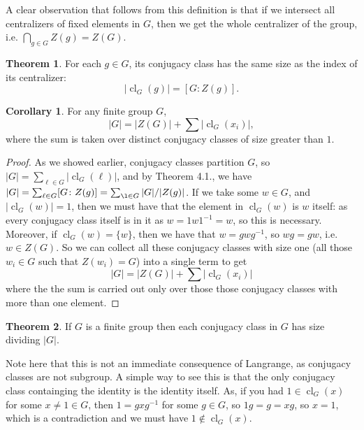 \documentclass[9pt,reqno]{amsart}
\theoremstyle{definition}
\newtheorem{theorem}{Theorem}[section]
\newtheorem{rem}{Remark}[section]
\newtheorem{coro}{Corollary}[section]
\DeclareMathOperator{\cl}{cl}
\begin{document}
A clear observation that follows from this definition is that if we intersect all centralizers of fixed elements in $G$, then we get the whole centralizer of the group, i.e. $\bigcap_{g \in G} Z(g) = Z(G)$. 
\begin{theorem}
	For each $g \in G$, its conjugacy class has the same size as the index of its centralizer:
	$$| \cl_G (g) | = [G \colon Z(g) ].$$
\end{theorem}
\begin{coro}
For any finite group $G$,  $$ |G| = |Z(G)| + \sum |\cl_G(x_i)|,$$ where the sum is taken over distinct conjugacy classes of size greater than $1$.
\end{coro}
\begin{proof}
	As we showed earlier, conjugacy classes partition $G$, so $|G| = \sum_{ \ell \in G} |\cl_G ( \ell)|$, and by Theorem 4.1., we have $|G| = \sum_{ \ell \in G} [G \colon Z(g) ] = \sum_{\l \in G } |G|/ |Z(g)|$. If we take some $w \in G$, and $ | \cl_G(w) | = 1$, then we must have that the element in $\cl_G(w) $ is $w$ itself: as every conjugacy class itself is in it as $w = 1 w 1^{-1} = w$, so this is necessary. Moreover, if $\cl_G( w) = \{ w \}$, then we have that $w = gwg^{-1}$, so $w g = gw$, i.e. $w \in Z(G)$. So we can collect all these conjugacy classes with size one (all those $w_i \in G$ such that $Z(w_i) = G$) into a single term to get $$|G| = |Z(G)| + \sum |\cl_G(x_i)|$$ where the the sum is carried out only over those those conjugacy classes with more than one element. 
\end{proof}
\begin{theorem}
	If $G$ is a finite group then each conjugacy class in $G$ has size dividing $|G|$.
\end{theorem}
Note here that this is not an immediate consequence of Langrange, as conjugacy classes are not subgroup. A simple way to see this is that the only conjugacy class containging the identity is the identity itself. As, if you had $1 \in \cl_G(x)$ for some $x \neq 1 \in G$, then $1 = gxg^{-1}$ for some $g \in G$, so $1g = g = xg$, so $x = 1$, which is a contradiction and we must have $1 \notin \cl_G (x)$.  
\end{document}
